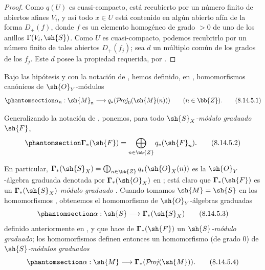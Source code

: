 \documentclass[oneside,10pt]{amsart}
\makeatletter
\newcommand{\ega@arrow}[2]{\mathchoice{#1}{#2}{#2}{#2}}
\renewcommand{\to}{\ega@arrow{\longrightarrow}{\rightarrow}}
\def\shProj{\mathcal{P}\!\mathit{roj}}
\newcommand{\oldpage}[2][]{\marginnote{\normalfont\footnotesize\textbf{#1}~|~#2}\ignorespaces}
\let\EGAOriginalLabel\label
\renewcommand{\label}[1]{\phantomsection\EGAOriginalLabel{#1}}
\makeatother
\begin{document}
\begin{proof}
Como $q(U)$ es cuasi-compacto, está recubierto por un número finito de abiertos afines $V_i$, y así todo $x\in U$ está contenido en algún abierto afín de la forma $D_+(f)$, donde $f$ es un elemento homogéneo de grado $>0$ de uno de los anillos $\Gamma(V_i,\sh{S})$.
Como $U$ es cuasi-compacto, podemos recubrirlo por un número finito de tales abiertos $D_+(f_j)$;
sea $d$ un múltiplo común de los grados de los $f_j$.
Este $d$ posee la propiedad requerida, por .
\end{proof}

\begin{env}[8.14.5]
\label{II.8.14.5}
Bajo las hipótesis y con la notación de , hemos definido, en , homomorfismos canónicos de $\sh{O}_Y$-módulos
\[
\label{II.8.14.5.1}
    \alpha_n: \sh{M}_n \to q_*(\shProj_0(\sh{M}(n)))
    \qquad (n\in\bb{Z}).
\tag{8.14.5.1}
\]

Generalizando la notación de , ponemos, para todo \emph{$\sh{S}_X$-módulo graduado $\sh{F}$},
\[
\label{II.8.14.5.2}
    \boldsymbol{\Gamma}_*(\sh{F}) = \bigoplus_{n\in\bb{Z}}q_*(\sh{F}_n).
\tag{8.14.5.2}
\]

En particular, $\boldsymbol{\Gamma}_*(\sh{S}_X)=\bigoplus_{n\in\bb{Z}}q_*(\sh{O}_X(n))$ es la $\sh{O}_Y$-álgebra graduada denotada por $\boldsymbol{\Gamma}_*(\sh{O}_X)$ en ;
está claro que $\boldsymbol{\Gamma}_*(\sh{F})$ es un \emph{$\boldsymbol{\Gamma}_*(\sh{S}_X)$-módulo graduado} .
Cuando
\oldpage[II]{199}
tomamos $\sh{M}=\sh{S}$ en los homomorfismos , obtenemos el homomorfismo de $\sh{O}_Y$-álgebras graduadas
\[
\label{II.8.14.5.3}
    \alpha:\sh{S}\to\boldsymbol{\Gamma}_*(\sh{S}_X)
\tag{8.14.5.3}
\]
definido anteriormente en , y que hace de $\boldsymbol{\Gamma}_*(\sh{F})$ un \emph{$\sh{S}$-módulo graduado};
los homomorfismos  definen entonces un homomorfismo (de grado $0$) de \emph{$\sh{S}$-módulos graduados}
\[
\label{II.8.14.5.4}
    \alpha:\sh{M}\to\boldsymbol{\Gamma}_*(\shProj(\sh{M})).
\tag{8.14.5.4}
\]
\end{env}
\end{document}
